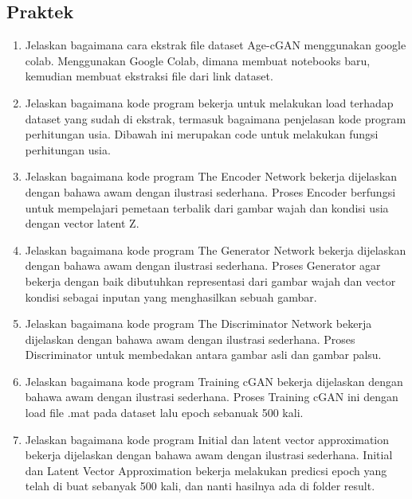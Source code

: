 \subsection{Praktek}
\begin{enumerate}
\item Jelaskan bagaimana cara ekstrak ﬁle dataset Age-cGAN menggunakan google colab.
Menggunakan Google Colab, dimana membuat notebooks baru, kemudian membuat ekstraksi file dari link dataset.




\item Jelaskan bagaimana kode program bekerja untuk melakukan load terhadap dataset yang sudah di ekstrak, termasuk bagaimana penjelasan kode program perhitungan usia.
Dibawah ini merupakan code untuk melakukan fungsi perhitungan usia.



	\item Jelaskan bagaimana kode program The Encoder Network bekerja dijelaskan dengan bahawa awam dengan ilustrasi sederhana.
Proses Encoder berfungsi untuk mempelajari pemetaan terbalik dari gambar wajah dan kondisi usia dengan vector latent Z.

		

	\item Jelaskan bagaimana kode program The Generator Network bekerja dijelaskan dengan bahawa awam dengan ilustrasi sederhana.
Proses Generator agar bekerja dengan baik dibutuhkan representasi dari gambar wajah dan vector kondisi sebagai inputan yang menghasilkan sebuah gambar.

		

        	\item Jelaskan bagaimana kode program The Discriminator Network bekerja dijelaskan dengan bahawa awam dengan ilustrasi sederhana.
Proses Discriminator untuk membedakan antara gambar asli dan gambar palsu.

		

        	\item Jelaskan bagaimana kode program Training cGAN bekerja dijelaskan dengan bahawa awam dengan ilustrasi sederhana.
Proses Training cGAN ini dengan load file .mat pada dataset lalu epoch sebanuak 500 kali.

		

        	\item Jelaskan bagaimana kode program Initial dan latent vector approximation bekerja dijelaskan dengan bahawa awam dengan ilustrasi sederhana.
Initial dan Latent Vector Approximation bekerja melakukan predicsi epoch yang telah di buat sebanyak 500 kali, dan nanti hasilnya ada di folder result.

		
\end{enumerate}
